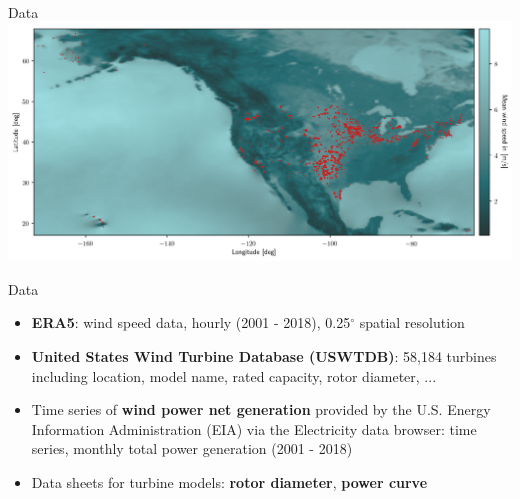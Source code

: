 \documentclass[color=usenames,dvipsnames]{beamer}
\begin{document}
    \begin{frame}{Data}
        \includegraphics[width=\textwidth]{../../figures/mean_wind_speed_and_turbines.png}
    \end{frame}

    \begin{frame}{Data}
        \begin{itemize}
            \item \textbf{ERA5}: wind speed data, hourly (2001 - 2018),
                0.25$^\circ$ spatial resolution\pause
            \item \textbf{United States Wind Turbine Database (USWTDB)}:
                58,184 turbines including location, model name, rated capacity,
                rotor diameter, ...\pause
            \item Time series of \textbf{wind power net generation} provided by
                the U.S. Energy Information Administration (EIA) via the
                Electricity data browser: time series, monthly total power
                generation (2001 - 2018)\pause
            \item Data sheets for turbine models:
                \textbf{rotor diameter}, \textbf{power curve}
        \end{itemize}
    \end{frame}
\end{document}
